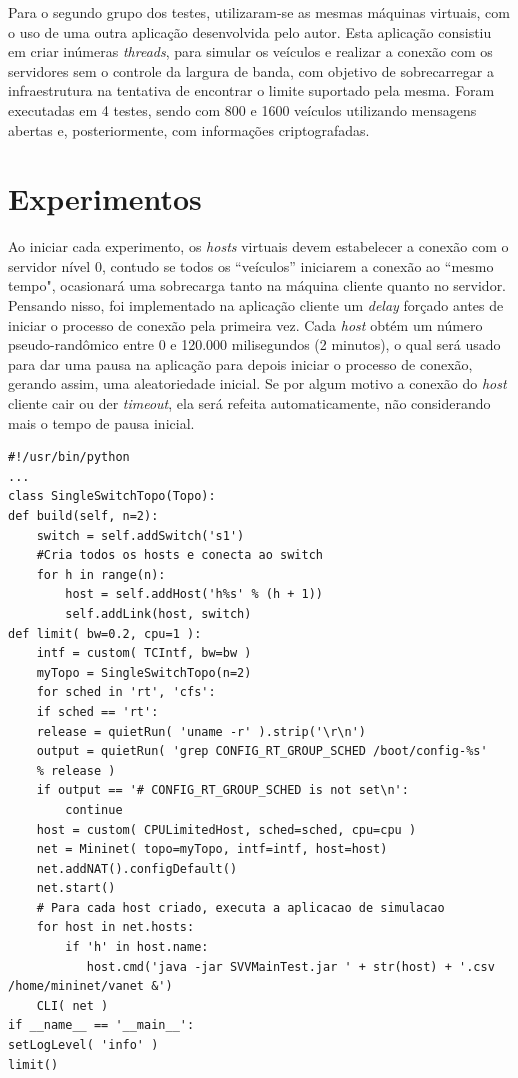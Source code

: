 \documentclass[
	12pt,				%
	oneside,			%
	a4paper,			%
	english,			%
	brazil				%
	]{abntex2ppgsi}
\begin{document}
Para o segundo grupo dos testes, utilizaram-se as mesmas máquinas virtuais, com o uso de uma outra aplicação desenvolvida pelo autor. Esta aplicação consistiu em criar inúmeras \textit{threads}, para simular os veículos e realizar a conexão com os servidores sem o controle da largura de banda, com objetivo de sobrecarregar a infraestrutura na tentativa de encontrar o limite suportado pela mesma. Foram executadas em 4 testes, sendo com 800 e 1600 veículos utilizando mensagens abertas e, posteriormente, com informações criptografadas.

\section{Experimentos}

Ao iniciar cada experimento, os \textit{hosts} virtuais devem estabelecer a conexão com o servidor nível 0, contudo se todos os ``veículos''  iniciarem a conexão ao ``mesmo tempo", ocasionará uma sobrecarga tanto na máquina cliente quanto no servidor. Pensando nisso, foi implementado na aplicação cliente um \textit{delay} forçado antes de iniciar o processo de conexão pela primeira vez. Cada \textit{host} obtém um número pseudo-randômico entre 0 e 120.000 milisegundos (2 minutos), o qual será usado para dar uma pausa na aplicação para depois iniciar o processo de conexão, gerando assim, uma aleatoriedade inicial. Se por algum motivo a conexão do \textit{host} cliente cair ou der \textit{timeout}, ela será refeita automaticamente, não considerando mais o tempo de pausa inicial. 




\begin{lstlisting}[caption=Script Python para criação dos hosts no mininet., label=src:python]
#!/usr/bin/python
...
class SingleSwitchTopo(Topo):
def build(self, n=2):
    switch = self.addSwitch('s1')
    #Cria todos os hosts e conecta ao switch
    for h in range(n):	
		host = self.addHost('h%s' % (h + 1))
		self.addLink(host, switch)
def limit( bw=0.2, cpu=1 ):
	intf = custom( TCIntf, bw=bw )
	myTopo = SingleSwitchTopo(n=2)
	for sched in 'rt', 'cfs':
	if sched == 'rt':
	release = quietRun( 'uname -r' ).strip('\r\n')
	output = quietRun( 'grep CONFIG_RT_GROUP_SCHED /boot/config-%s'
	% release )
	if output == '# CONFIG_RT_GROUP_SCHED is not set\n':
		continue
	host = custom( CPULimitedHost, sched=sched, cpu=cpu )
	net = Mininet( topo=myTopo, intf=intf, host=host)
	net.addNAT().configDefault()
	net.start()
	# Para cada host criado, executa a aplicacao de simulacao
	for host in net.hosts:
		if 'h' in host.name:
		   host.cmd('java -jar SVVMainTest.jar ' + str(host) + '.csv /home/mininet/vanet &')
	CLI( net )
if __name__ == '__main__':
setLogLevel( 'info' )
limit()
\end{lstlisting}
\end{document}
